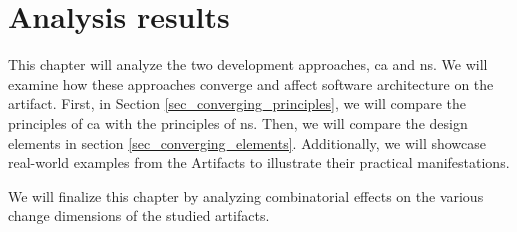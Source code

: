 \chapter{Analysis results} \label{chap_evaluation}

This chapter will analyze the two development approaches, \gls{ca} and \gls{ns}. We will
examine how these approaches converge and affect software architecture on the artifact.
First, in Section \ref{sec_converging_principles}, we will compare the principles of
\gls{ca} with the principles of \gls{ns}. Then, we will compare the design elements in
section \ref{sec_converging_elements}. Additionally, we will showcase real-world examples
from the Artifacts to illustrate their practical manifestations.

We will finalize this chapter by analyzing combinatorial effects on the various change
dimensions of the studied artifacts.







